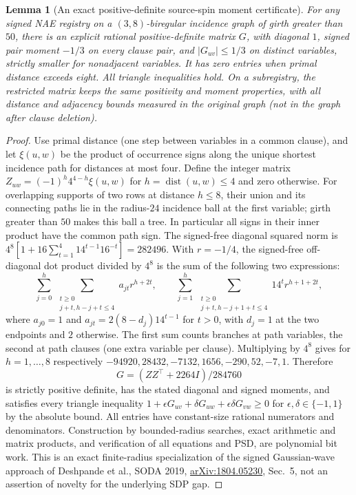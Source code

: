 \documentclass[11pt]{article}
\newtheorem{lemma}[theorem]{Lemma}
\begin{document}
\begin{lemma}[An exact positive-definite source-spin moment certificate]\label{lem:ms21-gram}
For any signed NAE registry on a $(3,8)$-biregular incidence graph of girth greater than $50$, there is an explicit rational positive-definite matrix $G$, with diagonal $1$, signed pair moment $-1/3$ on every clause pair, and $|G_{uv}|\le1/3$ on distinct variables, strictly smaller for nonadjacent variables. It has zero entries when primal distance exceeds eight. All triangle inequalities hold. On a subregistry, the restricted matrix keeps the same positivity and moment properties, with all distance and adjacency bounds measured in the original graph (not in the graph after clause deletion).
\end{lemma}
\begin{proof}
Use primal distance (one step between variables in a common clause), and let $\xi(u,w)$ be the product of occurrence signs along the unique shortest incidence path for distances at most four. Define the integer matrix $Z_{uw}=(-1)^h4^{4-h}\xi(u,w)$ for $h=\operatorname{dist}(u,w)\le4$ and zero otherwise. For overlapping supports of two rows at distance $h\le8$, their union and its connecting paths lie in the radius-$24$ incidence ball at the first variable; girth greater than $50$ makes this ball a tree. In particular all signs in their inner product have the common path sign. The signed-free diagonal squared norm is $4^8[1+16\sum_{t=1}^4 14^{t-1}16^{-t}]=282496$. With $r=-1/4$, the signed-free off-diagonal dot product divided by $4^8$ is the sum of the following two expressions:
\[
\sum_{j=0}^{h}\ \sum_{\substack{t\ge0\\j+t,h-j+t\le4}} a_{jt}r^{h+2t},
\qquad
\sum_{j=1}^{h}\ \sum_{\substack{t\ge0\\j+t,h-j+1+t\le4}}14^t r^{h+1+2t},
\]
where $a_{j0}=1$ and $a_{jt}=2(8-d_j)14^{t-1}$ for $t>0$, with $d_j=1$ at the two endpoints and $2$ otherwise. The first sum counts branches at path variables, the second at path clauses (one extra variable per clause). Multiplying by $4^8$ gives for $h=1,\ldots,8$ respectively $-94920,28432,-7132,1656,-290,52,-7,1$. Therefore
\[
G=(ZZ^\top+2264 I)/284760
\]
is strictly positive definite, has the stated diagonal and signed moments, and satisfies every triangle inequality $1+\epsilon G_{uv}+\delta G_{uw}+\epsilon\delta G_{vw}\ge0$ for $\epsilon,\delta\in\{-1,1\}$ by the absolute bound. All entries have constant-size rational numerators and denominators. Construction by bounded-radius searches, exact arithmetic and matrix products, and verification of all equations and PSD, are polynomial bit work. This is an exact finite-radius specialization of the signed Gaussian-wave approach of Deshpande et al., SODA 2019, \href{https://arxiv.org/abs/1804.05230}{arXiv:1804.05230}, Sec.~5, not an assertion of novelty for the underlying SDP gap.
\end{proof}
\end{document}

